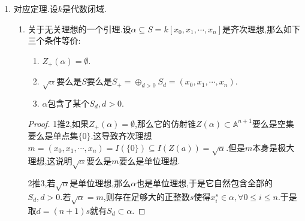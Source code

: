 \begin{enumerate}
\begin{enumerate}
\begin{proof}
    		首先必然有$I(Y)\subseteq I(C(Y))$.现在任取$f\in I(C(Y))$,即$C(Y)$中每个点都是$f$的零点.做齐次分解$f=f_0+f_1+\cdots+f_t$,那么要证$f\in I(Y)$等价于证明每个$f_i$都是以$Y\subset\mathbb{P}^n$为零点集的齐次多项式.
    		
    		首先$0\in C(Y)$得到$f_0=0$.现在任取$x_0\in C(Y)$,任取$\lambda\in k$,得到$\lambda x_0\in C(Y)$,于是总有$\lambda f_1(x_0)+\lambda^2f_2(x_0)+\cdots+\lambda^tf_t(x_0)=0$.按照$k$是无限域,得到$f_i(x_0)=0,\forall i,x_0\in C(Y)$成立,于是$f_i\in I(Y)$,于是$f=\sum_if_i\in I(Y)$.
    	\end{proof}
    	\item 射影簇的仿射锥是仿射簇.在给出对应定理后就得到$Y$是射影簇等价于$I(Y)$是素理想,于是上一条得到$I(C(Y))$是素理想,于是得到$C(Y)$是仿射簇.
    \end{enumerate}
    \item 对应定理.设$k$是代数闭域.
    \begin{enumerate}
    	\item 关于无关理想的一个引理.设$\alpha\subseteq S=k[x_0,x_1,\cdots,x_n]$是齐次理想,那么如下三个条件等价:
    	\begin{enumerate}
    		\item $Z_+(\alpha)=\emptyset$.
    		\item $\sqrt{\alpha}$要么是$S$要么是$S_+=\oplus_{d>0}S_d=(x_0,x_1,\cdots,x_n)$.
    		\item $\alpha$包含了某个$S_d,d>0$.
    	\end{enumerate}
    	\begin{proof}
    		
    		1推2,如果$Z_+(\alpha)=\emptyset$,那么它的仿射锥$Z(\alpha)\subset\mathbb{A}^{n+1}$要么是空集要么是单点集$\{0\}$.这导致齐次理想$m=(x_0,x_1,\cdots,x_n)=I(\{0\})\subseteq I(Z(a))=\sqrt{\alpha}$.但是$m$本身是极大理想,这说明$\sqrt{\alpha}$要么是$m$要么是单位理想.
    		
    		2推3,若$\sqrt{\alpha}$是单位理想,那么$\alpha$也是单位理想,于是它自然包含全部的$S_d,d>0$.若$\sqrt{\alpha}=m$,则存在足够大的正整数$s$使得$x_i^s\in\alpha,\forall 0\le i\le n$.于是取$d=(n+1)s$就有$S_d\subset\alpha$.
    		

\end{proof}
\end{enumerate}
\end{enumerate}
